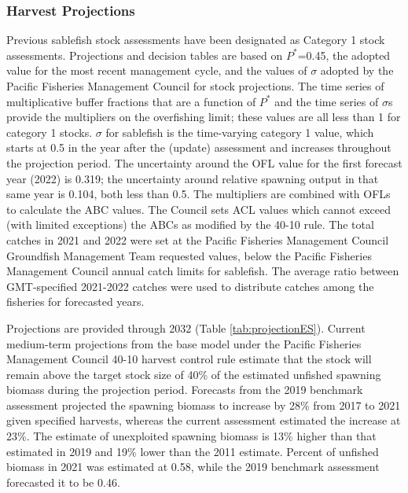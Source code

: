 \documentclass[11pt,
  english,
  a4paper,
]{article}
\begin{document}

\hypertarget{harvest-projections}{%
\subsubsection*{Harvest Projections}\label{harvest-projections}}

\leavevmode\tagmcend\tagstructend

Previous sablefish stock assessments have been designated as Category 1 stock assessments. Projections and decision tables are based on $P^*$=0.45, the adopted value for the most recent management cycle, and the values of $\sigma$ adopted by the Pacific Fisheries Management Council for stock projections. The time series of multiplicative buffer fractions that are a function of $P^*$ and the time series of $\sigma$s provide the multipliers on the overfishing limit; these values are all less than 1 for category 1 stocks. $\sigma$ for sablefish is the time-varying category 1 value, which starts at 0.5 in the year after the (update) assessment and increases throughout the projection period. The uncertainty around the OFL value for the first forecast year (2022) is 0.319; the uncertainty around relative spawning output in that same year is 0.104, both less than 0.5. The multipliers are combined with OFLs to calculate the ABC values. The Council sets ACL values which cannot exceed (with limited exceptions) the ABCs as modified by the 40-10 rule. The total catches in 2021 and 2022 were set at the Pacific Fisheries Management Council Groundfish Management Team requested values, below the Pacific Fisheries Management Council annual catch limits for sablefish. The average ratio between GMT-specified 2021-2022 catches were used to distribute catches among the fisheries for forecasted years.

Projections are provided through 2032 (Table \ref{tab:projectionES}). Current medium-term projections from the base model under the Pacific Fisheries Management Council 40-10 harvest control rule estimate that the stock will remain above the target stock size of 40\% of the estimated unfished spawning biomass during the projection period.  Forecasts from the 2019 benchmark assessment projected the spawning biomass to increase by 28\% from 2017 to 2021 given specified harvests, whereas the current assessment estimated the increase at 23\%. The estimate of unexploited spawning biomass is 13\% higher than that estimated in 2019 and 19\% lower than the 2011 estimate. Percent of unfished biomass in 2021 was estimated at 0.58, while the 2019 benchmark assessment forecasted it to be  0.46.
\end{document}
